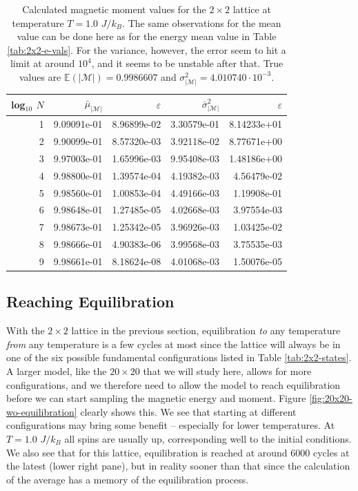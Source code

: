\documentclass[]{article}
\begin{document}
\begin{table}[!h]
	\caption{Calculated magnetic moment values for the $2 \times 2$ lattice at temperature $T=1.0$ $J/k_B$. The same observations for the mean value can be done here as for the energy mean value in Table \ref{tab:2x2-e-vals}. For the variance, however, the error seem to hit a limit at around $10^4$, and it seems to be unstable after that. True values are $\mathbb{E}(|\mathcal{M}|) = 0.9986607$ and $\sigma_{|\mathcal{M}|}^2 = 4.010740 \cdot 10^{-3}$.}
	\label{tab:2x2-m-vals}
	\begin{center}
		\begin{tabular}{r|rr|rr}
			\toprule
			log$_{10}$ $N$ & $\bar{\mu}_{|\mathcal{M}|}$ & $\varepsilon$ & $\bar{\sigma}^2_{|\mathcal{M}|}$ & $\varepsilon$ \\
			\midrule
				1 & 9.09091e-01 & 8.96899e-02 & 3.30579e-01 & 8.14233e+01 \\
				2 & 9.90099e-01 & 8.57320e-03 & 3.92118e-02 & 8.77671e+00 \\
				3 & 9.97003e-01 & 1.65996e-03 & 9.95408e-03 & 1.48186e+00 \\
				4 & 9.98800e-01 & 1.39574e-04 & 4.19382e-03 & 4.56479e-02 \\
				5 & 9.98560e-01 & 1.00853e-04 & 4.49166e-03 & 1.19908e-01 \\
				6 & 9.98648e-01 & 1.27485e-05 & 4.02668e-03 & 3.97554e-03 \\
				7 & 9.98673e-01 & 1.25342e-05 & 3.96926e-03 & 1.03425e-02 \\
				8 & 9.98666e-01 & 4.90383e-06 & 3.99568e-03 & 3.75535e-03 \\
				9 & 9.98661e-01 & 8.18624e-08 & 4.01068e-03 & 1.50076e-05 \\
			\bottomrule
		\end{tabular}
	\end{center}
\end{table}



\subsection{Reaching Equilibration} \label{sec:equilibration}

With the $2 \times 2$ lattice in the previous section, equilibration \textit{to} any temperature \textit{from} any temperature is a few cycles at most since the lattice will always be in one of the six possible fundamental configurations listed in Table \ref{tab:2x2-states}. A larger model, like the $20 \times 20$ that we will study here, allows for more configurations, and we therefore need to allow the model to reach equilibration before we can start sampling the magnetic energy and moment. Figure \ref{fig:20x20-wo-equilibration} clearly shows this. We see that starting at different configurations may bring some benefit -- especially for lower temperatures. At $T = 1.0$ $J/k_B$ all spins are usually up, corresponding well to the initial conditions. We also see that for this lattice, equilibration is reached at around 6000 cycles at the latest (lower right pane), but in reality sooner than that since the calculation of the average has a memory of the equilibration process.
\end{document}
